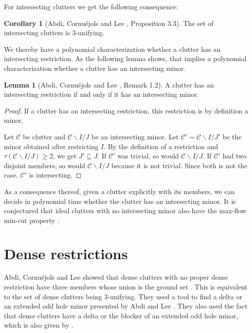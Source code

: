 \documentclass[a4paper, 12pt]{scrbook}
\theoremstyle{definition}
\newtheorem{corollary}[theorem]{Corollary}
\newtheorem{lemma}[theorem]{Lemma}
\begin{document}
   For intersecting clutters we get the following consequence:
   \begin{corollary}[Abdi, Cornuéjols and Lee \cite{restrictions}, Proposition 3.3]
       The set of intersecting clutters is 3-unifying.
   \end{corollary}
   We thereby have a polynomial characterization whether a clutter has an intersecting restriction. As the following lemma shows, that implies a polynomial characterization whether a clutter has an intersecting minor.

   \begin{lemma}[Abdi, Cornuéjols and Lee \cite{restrictions}, Remark 1.2]\label{intersectingminor}
       A clutter has an intersecting restriction if and only if it has an intersecting minor.
   \end{lemma}

  \begin{proof}
      If a clutter has an intersecting restriction, this restriction is by definition a minor.

      Let $\mathcal{C}$ be clutter and $\mathcal{C} \backslash I /J$ be an intersecting minor.
      Let $\mathcal{C'}=\mathcal{C} \backslash I /J'$ be the minor obtained after restricting $I$.
      By the definition of a restriction and $\tau(\mathcal{C} \backslash I /J) \geq 2$, we get $J' \subseteq J$. If $\mathcal{C'}$ was trivial, so would $\mathcal{C} \backslash I / J$.
      If $\mathcal{C'}$ had two disjoint members, so would $\mathcal{C} \backslash I /J$ because it is not trivial.
      Since both is not the case, $\mathcal{C'}$ is intersecting.
  \end{proof}

  As a consequence thereof, given a clutter explicitly with its members, we can decide in polynomial time whether the clutter has an intersecting minor. It is conjectured that ideal clutters with no intersecting minor also have the max-flow min-cut property \cite{restrictions}.


   \chapter{Dense restrictions}
   Abdi, Cornuéjols and Lee showed that dense clutters with no proper dense restriction have three members whose union is the ground set \cite{restrictions}.
   This is equivalent to the set of dense clutters being 3-unifying.
   They used a tool to find a delta or an extended odd hole minor presented by Abdi and Lee \cite{deltas}.
   They also used the fact that dense clutters have a delta or the blocker of an extended odd hole minor, which is also given by \cite{deltas}.
\end{document}

